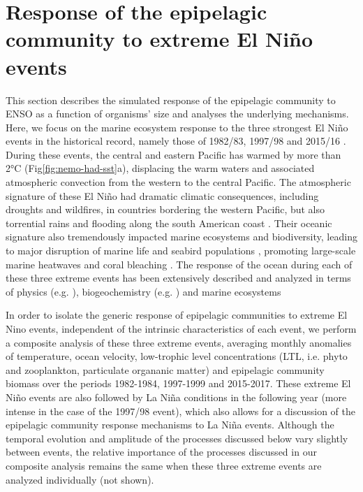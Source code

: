 \section{Response of the epipelagic community to extreme El Niño events}
\label{sec:nino-epi}

This section describes the simulated response of the epipelagic community to ENSO as a function of organisms' size and analyses the underlying mechanisms. Here, we focus on  the marine ecosystem response to the three strongest El Niño events in the historical record, namely those of 1982/83, 1997/98 and 2015/16 \citep{santosoDefiningCharacteristicsENSO2017}. During these events, the central and eastern Pacific has warmed by more than 2°C (Fig\ref{fig:nemo-had-sst}a), displacing the warm waters and associated atmospheric convection from the western to the central Pacific. The atmospheric signature of these El Niño had dramatic climatic consequences, including droughts and wildfires, in countries bordering the western Pacific, but also torrential rains and flooding along the south American coast \citep{caiClimateImpactsNino2020}. Their oceanic signature also tremendously impacted marine ecosystems and biodiversity, leading to major disruption of marine life and seabird populations \citep{valleImpact198219831987}, promoting large-scale marine heatwaves \citep{holbrookKeepingPaceMarine2020} and coral bleaching \citep{claarGlobalPatternsImpacts2018}.  The response of the ocean during each of these three extreme events has been extensively described and analyzed in terms of physics  (e.g. \citealp{philanderChapter33Simulation1985, lengaigneOceanResponseMarch2002, puyModulationEquatorialPacific2019}), biogeochemistry (e.g. \citealp{barberBiologicalConsequencesNino1983, chavezBiologicalChemicalResponse1999, strammaObservedNinoConditions2016}) and marine ecosystems \citep{glynnNINOSOUTHERNOSCILLATION198219831988, glynnCoralBleachingMortality2001, eakin20142017Globalscale2019} 

In order to isolate the generic response of epipelagic communities to extreme El Nino events, independent of the intrinsic characteristics of each event, we perform a composite analysis of these three extreme events, averaging monthly anomalies of temperature, ocean velocity, low-trophic level concentrations (LTL, i.e. phyto and zooplankton, particulate organanic matter) and epipelagic community biomass over the periods 1982-1984, 1997-1999 and 2015-2017. These extreme El Niño events are also followed by La Niña conditions in the following year (more intense in the case of the 1997/98 event), which also allows for a discussion  of the epipelagic community response mechanisms to La Niña events. Although the temporal evolution and amplitude of the processes discussed below vary slightly between events, the relative importance of the processes discussed in our composite analysis remains the same when these three extreme events are analyzed individually (not shown). 

